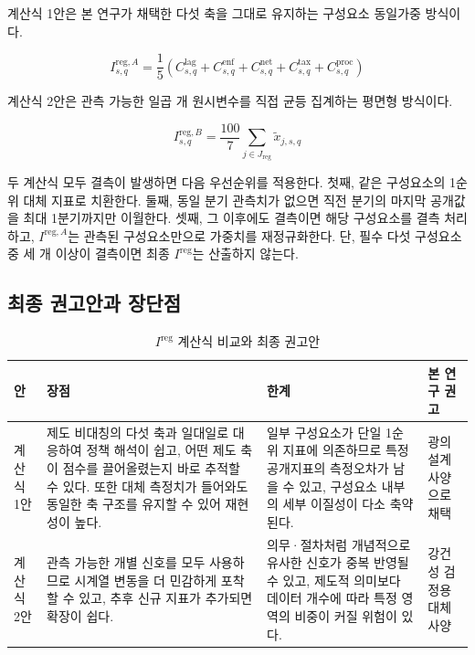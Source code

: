\documentclass[11pt,a4paper]{report}
\begin{document}
계산식 1안은 본 연구가 채택한 다섯 축을 그대로 유지하는 구성요소 동일가중 방식이다.

\begin{equation}
\label{eq:ireg_hierarchical}
I^{\mathrm{reg},A}_{s,q} = \frac{1}{5}\left(C^{\mathrm{lag}}_{s,q}+C^{\mathrm{enf}}_{s,q}+C^{\mathrm{net}}_{s,q}+C^{\mathrm{tax}}_{s,q}+C^{\mathrm{proc}}_{s,q}\right)
\end{equation}

계산식 2안은 관측 가능한 일곱 개 원시변수를 직접 균등 집계하는 평면형 방식이다.

\begin{equation}
\label{eq:ireg_flat}
I^{\mathrm{reg},B}_{s,q} = \frac{100}{7}\sum_{j \in J_{\mathrm{reg}}}\widetilde{x}_{j,s,q}
\end{equation}

두 계산식 모두 결측이 발생하면 다음 우선순위를 적용한다. 첫째, 같은 구성요소의 1순위 대체 지표로 치환한다. 둘째, 동일 분기 관측치가 없으면 직전 분기의 마지막 공개값을 최대 1분기까지만 이월한다. 셋째, 그 이후에도 결측이면 해당 구성요소를 결측 처리하고, $I^{\mathrm{reg},A}$는 관측된 구성요소만으로 가중치를 재정규화한다. 단, 필수 다섯 구성요소 중 세 개 이상이 결측이면 최종 $I^{\mathrm{reg}}$는 산출하지 않는다.

\subsection{최종 권고안과 장단점}
\begin{table}[H]
  \centering
  \footnotesize
  \caption{\texorpdfstring{$I^{\mathrm{reg}}$ 계산식 비교와 최종 권고안}{Ireg 계산식 비교와 최종 권고안}}\label{tab:ireg_formula_comparison}
  \begin{tabular}{L{1.8cm}L{4.2cm}L{4.1cm}L{3.5cm}}
    \toprule
    안 & 장점 & 한계 & 본 연구 권고 \\
    \midrule
    계산식 1안 & 제도 비대칭의 다섯 축과 일대일로 대응하여 정책 해석이 쉽고, 어떤 제도 축이 점수를 끌어올렸는지 바로 추적할 수 있다. 또한 대체 측정치가 들어와도 동일한 축 구조를 유지할 수 있어 재현성이 높다. & 일부 구성요소가 단일 1순위 지표에 의존하므로 특정 공개지표의 측정오차가 남을 수 있고, 구성요소 내부의 세부 이질성이 다소 축약된다. & 광의 설계 사양으로 채택 \\
    계산식 2안 & 관측 가능한 개별 신호를 모두 사용하므로 시계열 변동을 더 민감하게 포착할 수 있고, 추후 신규 지표가 추가되면 확장이 쉽다. & 의무·절차처럼 개념적으로 유사한 신호가 중복 반영될 수 있고, 제도적 의미보다 데이터 개수에 따라 특정 영역의 비중이 커질 위험이 있다. & 강건성 검정용 대체 사양 \\
    \bottomrule
  \end{tabular}
\end{table}
\end{document}
